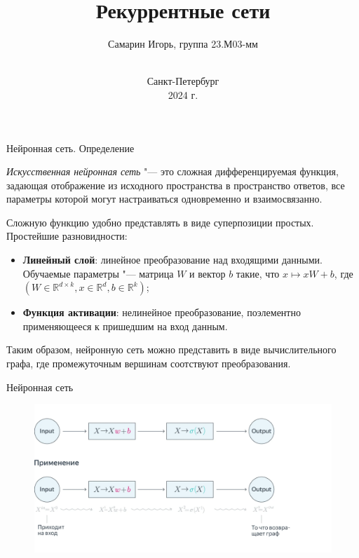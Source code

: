\documentclass[notheorems, handout, 10pt]{beamer}
\title[Рекуррентные сети]{Рекуррентные сети}
\author[Самарин И.А.]{Самарин Игорь, группа 23.М03-мм}
\institute{Санкт-Петербургский государственный университет\\Кафедра статистического моделирования}
\date{\vspace{3cm}\\Санкт-Петербург\\2024 г.}
\begin{document}
	
	\listoftables

	\begin{frame}[plain]
		
		\titlepage
		
		\note{ 
			
		}
		
	\end{frame}
	
	\begin{frame}{Нейронная сеть. Определение}
		
		\textsl{Искусственная нейронная сеть} "--- это сложная дифференцируемая функция, задающая отображение из исходного пространства в пространство ответов, все параметры которой могут настраиваться одновременно и взаимосвязанно.
		
		\vspace{0.2cm}
		
		Сложную функцию удобно представлять в виде суперпозиции простых. Простейшие разновидности:
		\begin{itemize}
			\item \textbf{Линейный слой}: линейное преобразование над входящими данными. Обучаемые параметры "--- матрица $W$ и вектор $b$ такие, что $x \mapsto xW + b$, где $(W \in \mathbb{R}^{d\times k}, x \in \mathbb{R}^{d}, b \in \mathbb{R}^{k})$;
			\item \textbf{Функция активации}: нелинейное преобразование, поэлементно применяющееся к пришедшим на вход данным.
		\end{itemize}
		
		Таким образом, нейронную сеть можно представить в виде вычислительного графа, где промежуточным вершинам соотствуют преобразования.
		
		\note{}
	
	\end{frame}
	
	\begin{frame}{Нейронная сеть}
		
		\begin{figure}[H]
			\includegraphics[width=1\linewidth]{images/1}
		\end{figure}
		
		\note{}
		
	\end{frame}
	
\end{document}
